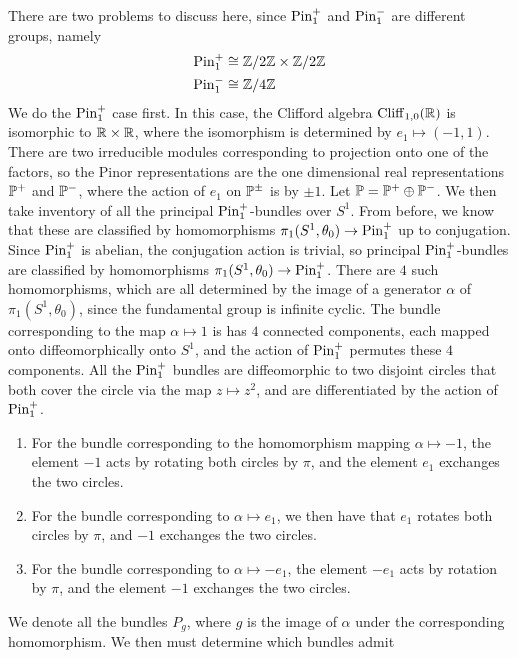 \begin{exmp} %
There are two problems to discuss here, since $\Pin_1^+$ and $\Pin_1^-$ are
different groups, namely
%
\begin{align*}
\Pin_1^+ &\cong \Z/2\Z \times \Z / 2\Z \\
\Pin_1^- &\cong \Z/4\Z
\end{align*}
%
We do the $\Pin_1^+$ case first. In this case, the Clifford algebra
$\Cliff_{1,0}(\R)$ is isomorphic to $\R \times \R$, where the isomorphism is
determined by $e_1 \mapsto (-1,1)$. There are two irreducible modules corresponding
to projection onto one of the factors, so the Pinor representations are the one
dimensional real representations $\P^+$ and $\P^-$, where the action of $e_1$ on
$\P^\pm$ is by $\pm 1$. Let $\P = \P^+ \oplus \P^-$. We then take inventory
of all the principal $\Pin_1^+$-bundles over $S^1$. From before, we know that these
are classified by homomorphisms $\pi_1(S^1, \theta_0) \to \Pin_1^+$ up to
conjugation. Since $\Pin_1^+$ is abelian, the conjugation action is trivial,
so principal $\Pin_1^+$-bundles are classified by homomorphisms
$\pi_1(S^1,\theta_0) \to \Pin_1^+$. There are $4$ such homomorphisms,
which are all determined by the image of a generator $\alpha$ of $
\pi_1(S^1,\theta_0)$, since the fundamental group is infinite cyclic. The bundle
corresponding to the map $\alpha \mapsto 1$ is has $4$ connected components,
each mapped onto diffeomorphically onto $S^1$, and the action of $\Pin_1^+$
permutes these $4$ components. All the $\Pin_1^+$ bundles are diffeomorphic
to two disjoint circles that both cover the circle via the map $z \mapsto z^2$,
and are differentiated by the action of $\Pin_1^+$.
%
\begin{enumerate}
  \item For the bundle corresponding to the homomorphism mapping
  $\alpha \mapsto -1$, the element $-1$ acts by rotating both circles by $\pi$,
  and the element $e_1$ exchanges the two circles.
  \item For the bundle corresponding to $\alpha \mapsto e_1$, we then have that
  $e_1$ rotates both circles by $\pi$, and $-1$ exchanges the two circles.
  \item For the bundle corresponding to $\alpha \mapsto -e_1$, the element
  $-e_1$ acts by rotation by $\pi$, and the element $-1$ exchanges the two
  circles.
\end{enumerate}
%
We denote all the bundles $P_g$, where $g$ is the image of $\alpha$ under
the corresponding homomorphism. We then must determine which bundles admit

\end{exmp}
